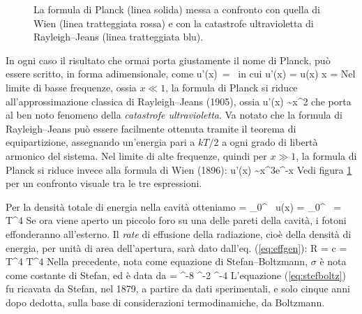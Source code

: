 \begin{figure}[h!t]
  \centering
{}
  \caption{La formula di Planck (linea solida) messa a confronto con quella di Wien (linea tratteggiata rossa) e con la catastrofe ultravioletta di Rayleigh--Jeans (linea tratteggiata blu).} 
  \label{fig:confrontoplanck}
\end{figure}

In ogni caso il risultato che ormai porta giustamente il nome di Planck, può essere scritto, in forma adimensionale, come
\be
\label{eq:adimbb}
u'(x)\, = \,
\ee
in cui
\be
u'(x) =  u(x) \quad {} \quad x = 
\ee 
Nel limite di basse frequenze, ossia $x \ll 1$, la formula di Planck si riduce all'approssimazione classica di Rayleigh--Jeans (1905), ossia
\be
u'(x) \sim x^2
\ee
che porta al ben noto fenomeno della {\em catastrofe ultravioletta}. Va notato che la formula di Rayleigh--Jeans può essere facilmente ottenuta tramite il teorema di equipartizione, assegnando un'energia pari a $kT/2$ a ogni grado di libertà armonico del sistema. Nel limite di alte frequenze, quindi per $x \gg 1$, la formula di Planck si riduce invece alla formula di Wien (1896):
\be
u'(x) \sim x^3e^{-x}
\ee
Vedi figura \ref{fig:confrontoplanck} per un confronto visuale tra le tre espressioni.

Per la densità totale di energia nella cavità otteniamo
\be
{} = \int_{0}^{\infty} \, u(x) =
\int_{0}^{\infty} \,
= \,T^4
\ee
Se ora viene aperto un piccolo foro su una delle pareti della cavità, i fotoni effonderanno all'esterno. Il {\em rate} di effusione della radiazione, cioè della densità di energia, per unità di area dell'apertura, sarà dato dall'eq. (\ref{eq:effgen}):
\be
\label{eq:stefboltz}
R = c =  T^4 \equiv \sigma T^4
\ee
Nella precedente, nota come equazione di Stefan--Boltzmann, $\sigma$ è nota come costante di Stefan, ed è data da
\be
\sigma =   ^{-8} ^{-2}
^{-4}
\ee
L'equazione (\ref{eq:stefboltz}) fu ricavata da Stefan, nel 1879, a partire da dati sperimentali, e solo cinque anni dopo dedotta, sulla base di considerazioni termodinamiche, da Boltzmann.

